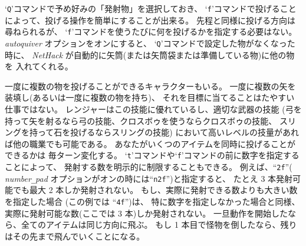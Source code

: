 `{\tt Q}'コマンドで予め好みの「発射物」を選択しておき、
`{\tt f}'コマンドで投げることによって、投げる操作を簡単にすることが出来る。
先程と同様に投げる方向は尋ねられるが、
`{\tt f}'コマンドを使うたびに何を投げるかを指定する必要はない。
{\it autoquiver\/}
オプションをオンにすると、
`{\tt Q}'コマンドで設定した物がなくなった時に、
{\it NetHack\/} が自動的に矢筒(または矢筒袋または準備している物)に他の物を
入れてくれる。

一度に複数の物を投げることができるキャラクターもいる。
一度に複数の矢を装填し(あるいは一度に複数の物を持ち)、
それを目標に当てることはたやすい仕事ではない。
レンジャーはこの技能に優れているし、適切な武器の技能
(弓を持って矢を射るなら弓の技能、クロスボゥを使うならクロスボゥの技能、
スリングを持って石を投げるならスリングの技能)
において高いレベルの技量があれば他の職業でも可能である。
あなたがいくつのアイテムを同時に投げることができるかは
毎ターン変化する。
`{\tt t}'コマンドや`{\tt f}'コマンドの前に数字を指定することによって、
発射する数を明示的に制限することもできる。
例えば、``{\tt 2f}''(
{\it number\verb+_+pad\/}
オプションがオンの時には``{\tt n2f}'')と指定すると、
たとえ 3 本発射可能でも最大 2 本しか発射されない。
もし、実際に発射できる数よりも大きい数を指定した場合
(この例では ``{\tt 4f}'')は、
特に数字を指定しなかった場合と同様、
実際に発射可能な数(ここでは 3 本)しか発射されない。
一旦動作を開始したなら、全てのアイテムは同じ方向に飛ぶ。
もし 1 本目で怪物を倒したなら、残りはその先まで飛んでいくことになる。

